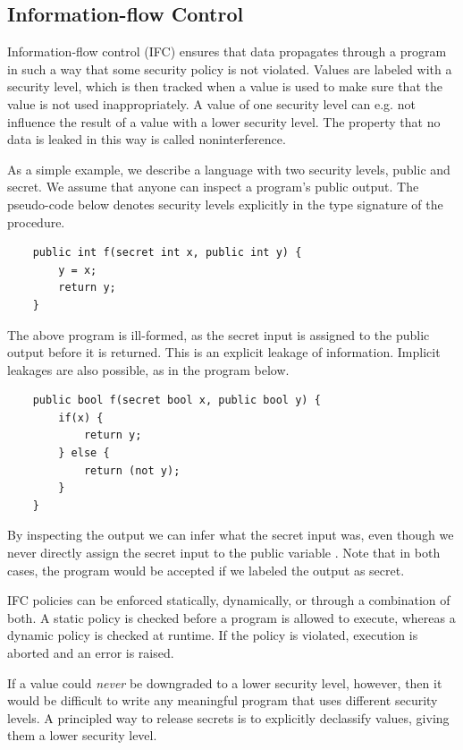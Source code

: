 \subsection{Information-flow Control}

Information-flow control (IFC)\cite{DBLP:series/natosec/HedinS12} ensures that data propagates through a program in such a way that some security policy is
not violated. Values are labeled with a security level, which is then tracked when a value is used to make sure that the
value is not used inappropriately.
A value of one security level can e.g. not influence the result of a value with a lower security level. The property that no data is leaked
in this way is called noninterference.

As a simple example, we describe a language with two security levels, public and secret. We assume that anyone can inspect
a program's public output. The pseudo-code below denotes security levels explicitly in the type signature
of the procedure.

\begin{verbatim}
    public int f(secret int x, public int y) {
        y = x;
        return y;
    }
\end{verbatim}

The above program is ill-formed, as the secret input is assigned to the public output before it is returned. This is an
explicit leakage of information. Implicit leakages are also possible, as in the program below.

\begin{verbatim}
    public bool f(secret bool x, public bool y) {
        if(x) {
            return y;
        } else {
            return (not y);
        }
    }
\end{verbatim}

By inspecting the output we can infer what the secret input was, even though we never directly assign the secret input
to the public variable . Note that in both cases, the program would be accepted if we labeled the output as secret.

IFC policies can be enforced statically, dynamically, or through a combination of both. A static policy is checked before
a program is allowed to execute, whereas a dynamic policy is checked at runtime. If the policy is violated, execution
is aborted and an error is raised.

If a value could \textit{never} be downgraded to a lower security level, however, then it would be difficult to write any meaningful program that uses
different security levels. A principled way to release secrets is to explicitly declassify values, giving them a lower
security level.

